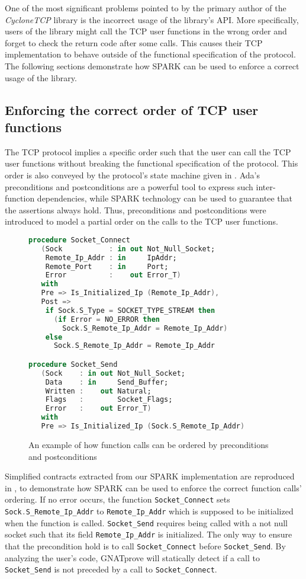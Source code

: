 \documentclass[conference]{IEEEtran}
\def\spark#1{\lstinline[language=Ada]{#1}}
\begin{document}
One of the most significant problems pointed to by the primary author of the \emph{CycloneTCP} library is the incorrect usage of the library's API. More specifically, users of the library might call the TCP user functions in the wrong order and forget to check the return code after some calls. This causes their TCP implementation to behave outside of the functional specification of the protocol. The following sections demonstrate how SPARK can be used to enforce a correct usage of the library.

\subsection{Enforcing the correct order of TCP user functions}

The TCP protocol implies a specific order such that the user can call the TCP user functions without breaking the functional specification of the protocol. This order is also conveyed by the protocol's state machine given in . Ada's preconditions and postconditions are a powerful tool to express such inter-function dependencies, while SPARK technology can be used to guarantee that the assertions always hold. Thus, preconditions and postconditions were introduced to model a partial order on the calls to the TCP user functions.

\begin{figure}
\begin{lstlisting}[language=Ada,basicstyle=\footnotesize\ttfamily, frame=bottomline]
procedure Socket_Connect
   (Sock           : in out Not_Null_Socket;
    Remote_Ip_Addr : in     IpAddr;
    Remote_Port    : in     Port;
    Error          :    out Error_T)
   with
   Pre => Is_Initialized_Ip (Remote_Ip_Addr),
   Post =>
    if Sock.S_Type = SOCKET_TYPE_STREAM then
      (if Error = NO_ERROR then
        Sock.S_Remote_Ip_Addr = Remote_Ip_Addr)
    else
      Sock.S_Remote_Ip_Addr = Remote_Ip_Addr

procedure Socket_Send
   (Sock    : in out Not_Null_Socket;
    Data    : in     Send_Buffer;
    Written :    out Natural;
    Flags   :        Socket_Flags;
    Error   :    out Error_T)
   with
   Pre => Is_Initialized_Ip (Sock.S_Remote_Ip_Addr)
\end{lstlisting}
\caption{An example of how function calls can be ordered by preconditions and
postconditions}
\label{fig:functionorder}
\end{figure}

Simplified contracts extracted from our SPARK implementation are reproduced in , to demonstrate how SPARK can be used to enforce the correct function calls' ordering. If no error occurs, the function \spark{Socket_Connect} sets \spark{Sock.S_Remote_Ip_Addr} to \spark{Remote_Ip_Addr} which is supposed to be initialized when the function is called. \spark{Socket_Send} requires being called with a not null socket such that its field \spark{Remote_Ip_Addr} is initialized. The only way to ensure that the precondition hold is to call \spark{Socket_Connect} before \spark{Socket_Send}. By analyzing the user's code, GNATprove will statically detect if a call to \spark{Socket_Send} is not preceded by a call to \spark{Socket_Connect}.
\end{document}
